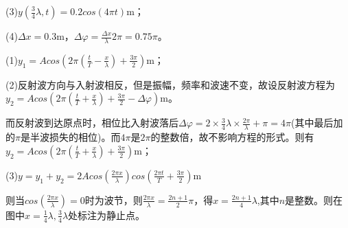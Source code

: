 (3)$y(\frac{3}{4}\lambda,t)=0.2cos(4\pi t)\mathrm{m}$；

(4)$\Delta x=0.3\mathrm{m}$，$\Delta \varphi=\frac{\Delta x}{\lambda}2\pi=0.75\pi$。

\exercise

\solve (1)$y_1=Acos(2\pi(\frac{t}{T}-\frac{x}{\lambda})+\frac{3\pi}{2})\mathrm{m}$；

(2)反射波方向与入射波相反，但是振幅，频率和波速不变，故设反射波方程为$y_2=Acos(2\pi(\frac{t}{T}+\frac{x}{\lambda})+\frac{3\pi}{2}-\Delta \varphi)\mathrm{m}$。

而反射波到达原点时，相位比入射波落后$\Delta \varphi =2\times\frac{3}{4}\lambda\times \frac{2\pi}{\lambda}+\pi=4\pi$(其中最后加的$\pi$是半波损失的相位)。而$4\pi$是$2\pi$的整数倍，故不影响方程的形式。则有$y_2=Acos(2\pi(\frac{t}{T}+\frac{x}{\lambda})+\frac{3\pi}{2})\mathrm{m}$；

(3)$y=y_1+y_2=2Acos(\frac{2\pi x}{\lambda})cos(\frac{2\pi t}{T}+\frac{3\pi}{2})\mathrm{m}$

则当$cos(\frac{2\pi x}{\lambda})=0$时为波节，则$\frac{2\pi x}{\lambda}=\frac{2n+1}{2}\pi$，得$x=\frac{2n+1}{4}\lambda$,其中$n$是整数。则在图中$x=\frac{1}{4}\lambda,\frac{3}{4}\lambda$处标注为静止点。
